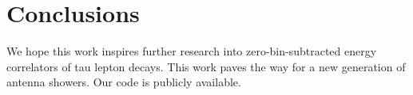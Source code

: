 \section{Conclusions}\label{sec:conclusions}

We hope this work inspires further research into zero-bin-subtracted
energy correlators of tau lepton decays. This work paves the way for a
new generation of antenna showers. Our code is publicly available.

